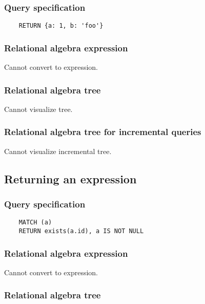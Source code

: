 	\subsubsection*{Query specification}

	\begin{lstlisting}
	RETURN {a: 1, b: 'foo'}
	\end{lstlisting}


	\subsubsection*{Relational algebra expression}

	Cannot convert to expression.

	\subsubsection*{Relational algebra tree}

	Cannot visualize tree.

	\subsubsection*{Relational algebra tree for incremental queries}

	Cannot visualize incremental tree.
	\subsection{Returning an expression}

	\subsubsection*{Query specification}

	\begin{lstlisting}
	MATCH (a)
	RETURN exists(a.id), a IS NOT NULL
	\end{lstlisting}


	\subsubsection*{Relational algebra expression}

	Cannot convert to expression.

	\subsubsection*{Relational algebra tree}

